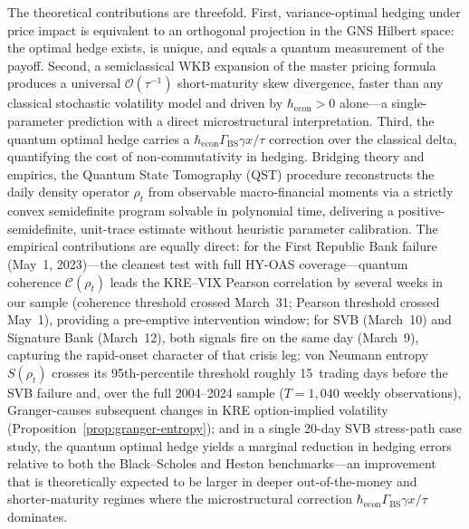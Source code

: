 The theoretical contributions are threefold. First, variance-optimal hedging
under price impact is equivalent to an orthogonal projection in the GNS Hilbert
space: the optimal hedge exists, is unique, and equals a quantum measurement of
the payoff. Second, a semiclassical WKB expansion of the master pricing formula
produces a universal $\mathcal{O}(\tau^{-1})$ short-maturity skew divergence,
faster than any classical stochastic volatility model and driven by
$\hbar_{\mathrm{econ}} > 0$ alone---a single-parameter prediction with a direct
microstructural interpretation. Third, the quantum optimal hedge carries a
$\hbar_{\mathrm{econ}}\Gamma_{\mathrm{BS}}\gamma x/\tau$ correction over the
classical delta, quantifying the cost of non-commutativity in hedging. Bridging
theory and empirics, the Quantum State Tomography (QST) procedure reconstructs
the daily density operator $\rho_t$ from observable macro-financial moments via
a strictly convex semidefinite program solvable in polynomial time, delivering a
positive-semidefinite, unit-trace estimate without heuristic parameter calibration.
The empirical contributions are equally direct: for the First Republic Bank
failure (May~1, 2023)---the cleanest test with full HY-OAS coverage---quantum
coherence $\mathcal{C}(\rho_t)$ leads the KRE--VIX Pearson correlation by
several weeks in our sample (coherence threshold crossed March~31; Pearson
threshold crossed May~1), providing a pre-emptive intervention window; for SVB (March~10) and Signature Bank (March~12),
both signals fire on the same day (March~9), capturing the rapid-onset character
of that crisis leg; von Neumann entropy $S(\rho_t)$ crosses its 95th-percentile
threshold roughly 15~trading days before the SVB failure and, over the full
2004--2024 sample ($T = 1{,}040$ weekly observations), Granger-causes subsequent
changes in KRE option-implied volatility (Proposition~\ref{prop:granger-entropy});
and in a single 20-day SVB stress-path case study, the quantum optimal hedge
yields a marginal reduction in hedging errors relative to both the Black--Scholes
and Heston benchmarks---an improvement that is theoretically expected to be larger
in deeper out-of-the-money and shorter-maturity regimes where the microstructural
correction $\hbar_{\mathrm{econ}}\Gamma_{\mathrm{BS}}\gamma x/\tau$ dominates.

